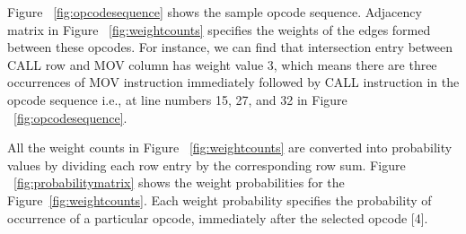 Figure ~\ref{fig:opcodesequence} shows the sample opcode sequence. Adjacency matrix in Figure ~\ref{fig:weightcounts} specifies the weights of the edges formed between these opcodes. For instance, we can find that intersection entry between CALL row and MOV column has weight value 3, which means there are three occurrences of MOV instruction immediately followed by CALL instruction in the opcode sequence i.e., at line numbers 15, 27, and 32 in Figure ~\ref{fig:opcodesequence}. 

All the weight counts in Figure ~\ref{fig:weightcounts} are converted into probability values by dividing each row entry by the corresponding row sum. Figure ~\ref{fig:probabilitymatrix} shows the weight probabilities for the Figure~\ref{fig:weightcounts}. Each weight probability specifies the probability of occurrence of a particular opcode, immediately after the selected opcode [4]. 

